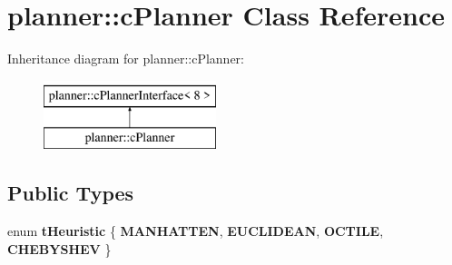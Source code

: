 \hypertarget{classplanner_1_1c_planner}{}\section{planner\+:\+:c\+Planner Class Reference}
\label{classplanner_1_1c_planner}
Inheritance diagram for planner\+:\+:c\+Planner\+:\begin{figure}[H]
\begin{center}
\leavevmode
\includegraphics[height=2.000000cm]{classplanner_1_1c_planner}
\end{center}
\end{figure}
\subsection*{Public Types}
\begin{DoxyCompactItemize}
\item 
\mbox{\label{classplanner_1_1c_planner_a7f6dc4cbb69dd1ede14a67b0a7bd425b}} 
enum {\bfseries t\+Heuristic} \{ {\bfseries M\+A\+N\+H\+A\+T\+T\+EN}, 
{\bfseries E\+U\+C\+L\+I\+D\+E\+AN}, 
{\bfseries O\+C\+T\+I\+LE}, 
{\bfseries C\+H\+E\+B\+Y\+S\+H\+EV}
 \}
\end{DoxyCompactItemize}
